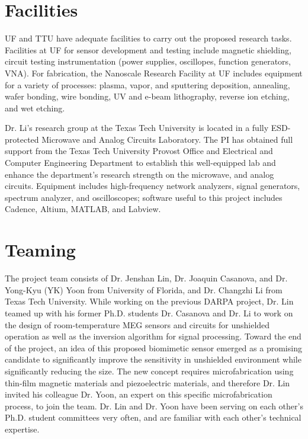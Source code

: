 \section{Facilities}
UF and TTU have adequate facilities to carry out the proposed research tasks.
Facilities at UF for sensor development and testing include magnetic shielding, circuit testing instrumentation (power supplies, oscillopes, function generators, VNA). For fabrication, the Nanoscale Research Facility at UF includes equipment for a variety of processes: plasma, vapor, and sputtering deposition, annealing, wafer bonding, wire bonding, UV and e-beam lithography, reverse ion etching, and wet etching.

Dr. Li's research group at the Texas Tech University is located in a fully ESD-protected Microwave and Analog Circuits Laboratory. The PI has obtained full support from the Texas Tech University Provost Office and Electrical and Computer Engineering Department to establish this well-equipped lab and enhance the department’s research strength on the microwave, and analog circuits. Equipment includes high-frequency network analyzers, signal generators, spectrum analyzer, and oscilloscopes; software useful to this project includes Cadence, Altium, MATLAB, and Labview.

\section{Teaming}
The project team consists of Dr. Jenshan Lin, Dr. Joaquin Casanova, and Dr. Yong-Kyu (YK) Yoon from University of Florida, and Dr. Changzhi Li from Texas Tech University. While working on the previous DARPA project, Dr. Lin teamed up with his former Ph.D. students Dr. Casanova and Dr. Li to work on the design of room-temperature MEG sensors and circuits for unshielded operation as well as the inversion algorithm for signal processing. Toward the end of the project, an idea of this proposed biomimetic sensor emerged as a promising candidate to significantly improve the sensitivity in unshielded environment while significantly reducing the size. The new concept requires microfabrication using thin-film magnetic materials and piezoelectric materials, and therefore Dr. Lin invited his colleague Dr. Yoon, an expert on this specific microfabrication process, to join the team. Dr. Lin and Dr. Yoon have been serving on each other’s Ph.D. student committees very often, and are familiar with each other’s technical expertise.

